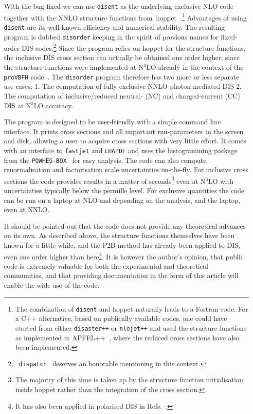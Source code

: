 \documentclass[submission, PhysCodeb]{SciPost}
\newcommand{\hoppet}{{\sc hoppet}}
\newcommand{\disent}{{\tt disent}}
\newcommand{\disorder}{{\tt disorder}}
\newcommand{\disaster}{{\tt disaster++}}
\newcommand{\nlojet}{{\tt nlojet++}}
\newcommand{\NNNLO}{N$^3$LO}
\begin{document}
With the bug fixed we can use \disent{} as the underlying exclusive
NLO code together with the NNLO structure functions
from~\hoppet{}~\cite{Salam:2008qg,BertoneKarlberg}.\footnote{The
combination of \disent{} and \hoppet{} naturally leads to a Fortran
code. For a C++ alternative, based on publically available codes, one
could have started from either \disaster{} or \nlojet{} and used the
structure functions as implemented in
APFEL++~\cite{Bertone:2013vaa,Bertone:2017gds}, where the reduced
cross sections have also been implemented.} Advantages of using
\disent{} are its well-known efficiency and numerical stability. The
resulting program is dubbed \disorder{} keeping in the spirit of
previous names for fixed-order DIS codes.\footnote{{\tt
  dispatch}~\cite{Dasgupta:2002dc} deserves an honorable mentioning in
this context.} Since the program relies on \hoppet{} for the structure
functions, the inclusive DIS cross section can actually be obtained
one order higher, since the structure functions were implemented at
\NNNLO{} already in the context of the {\tt proVBFH}
code~\cite{Cacciari:2015jma,Dreyer:2016oyx,Dreyer:2018qbw,Dreyer:2018rfu}. The
\disorder{} program therefore has two more or less separate use cases:
1. The computation of fully exclusive NNLO photon-mediated DIS 2. The
computation of inclusive/reduced neutral- (NC) and charged-current
(CC) DIS at \NNNLO{} accuracy.

The program is designed to be user-friendly with a simple command line
interface. It prints cross sections and all important
run-parameters to the screen and disk, allowing a user to acquire
cross sections with very little effort. It comes with an interface to
{\tt fastjet} and {\tt LHAPDF} and uses the histogramming package from
the {\tt POWHEG-BOX}~\cite{Alioli:2010xd} for easy analysis. The code
can also compute renormalisation and factorisation scale uncertainties
on-the-fly. For inclusive cross sections the code provides results in
a matter of seconds\footnote{The majority of this time is taken up by
the structure function initialisation inside \hoppet{} rather than the
integration of the cross section.} even at \NNNLO{} with uncertainties
typically below the permille level. For exclusive quantities the code
can be run on a laptop at NLO and depending on the analysis, and the
laptop, even at NNLO.

It should be pointed out that the code does not provide any
theoretical advances on its own. As described above, the structure
functions themselves have been known for a little while, and the P2B
method has already been applied to DIS, even one order higher than
here\footnote{It has also been applied in polarised DIS in
Refs.~\cite{Borsa:2020ulb,Borsa:2020yxh,Borsa:2021afb,Borsa:2022irn,Borsa:2022cap}.}. It
is however the author's opinion, that public code is extremely
valuable for both the experimental and theoretical communities, and
that providing documentation in the form of this article will enable
the wide use of the code.
\end{document}
